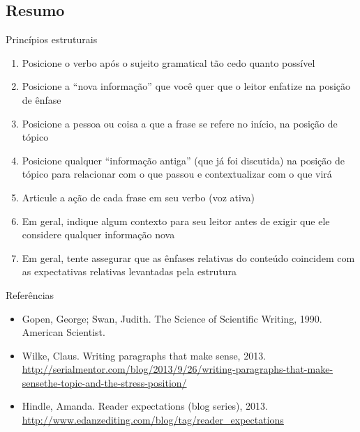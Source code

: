 \documentclass{beamer}
\begin{document}
\subsection{Resumo}

\begin{frame}{Princípios estruturais}

  \begin{enumerate}
  \item Posicione o verbo \alert{após} o sujeito gramatical \alert{tão
      cedo quanto possível}
  \item Posicione a ``nova informação'' que você quer que o leitor
    enfatize na \alert{posição de ênfase}
  \item Posicione a pessoa ou coisa a que a frase se refere no início,
    na \alert{posição de tópico}
  \item Posicione qualquer ``informação antiga'' (que já foi
    discutida) na \alert{posição de tópico} para relacionar com o que
    passou e contextualizar com o que virá
  \item Articule a ação de cada frase em seu verbo (\alert{voz ativa})
  \item Em geral, indique algum contexto para seu leitor antes de
    exigir que ele considere qualquer informação nova
  \item Em geral, tente assegurar que as ênfases relativas do conteúdo
    coincidem com as expectativas relativas levantadas pela estrutura
  \end{enumerate}
\end{frame}

\begin{frame}{Referências}
  \begin{itemize}
  \item<1-> Gopen, George; Swan, Judith. The Science of Scientific
    Writing, 1990. American Scientist.
  \item<1-> Wilke, Claus. Writing paragraphs that make sense,
    2013. \url{http://serialmentor.com/blog/2013/9/26/writing-paragraphs-that-make-sensethe-topic-and-the-stress-position/}
  \item<1-> Hindle, Amanda. Reader expectations (blog series),
    2013. \url{http://www.edanzediting.com/blog/tag/reader_expectations}
  \end{itemize}
\end{frame}
\end{document}
